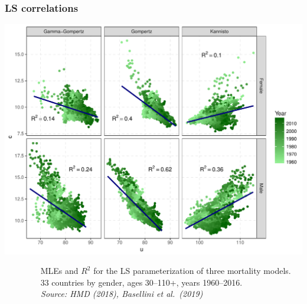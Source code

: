 \documentclass[12pt, xcolor=table]{beamer}  %
\begin{document}
\begin{frame}[noframenumbering]
\frametitle{LS correlations}
\vspace{-0.05cm}
\begin{center}
\includegraphics[scale=0.44]{Figures/Ch1/F7}
\end{center}
\vspace{-0.05cm}
\tiny{$\quad\quad\quad\quad$ MLEs and $R^2$ for the LS parameterization of three mortality models.\\ $\quad\quad\quad\quad$ 33 countries by gender, ages 30--110+, years 1960--2016. \\ \emph{$\quad\quad\quad\quad$ Source: HMD (2018), Basellini et al.~(2019)}} 
\end{frame}
\end{document}
